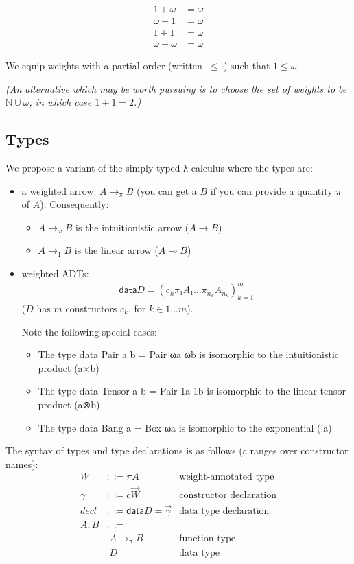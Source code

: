 \documentclass[11pt]{article}
\begin{document}
\begin{align*}
1 + ω &= ω \\
ω + 1 &= ω \\
1 + 1 &= ω \\
ω + ω &= ω
\end{align*}

We equip weights with a partial order (written \(· ≤ ·\)) such that \(1 ≤ ω\).

\emph{(An alternative which may be worth pursuing is to choose the set of
weights to be \(ℕ∪{ω}\), in which case \(1+1=2\).)}

\subsection{Types}
\label{sec:orgheadline2}

We propose a variant of the simply typed λ-calculus where the types
are:

\begin{itemize}
\item a weighted arrow: \(A →_π B\) (you can get a \(B\) if you can provide a
quantity \(π\) of \(A\)). Consequently:
\begin{itemize}
\item \(A →_ω B\) is the intuitionistic arrow (\(A → B\))
\item \(A →_1 B\) is the linear arrow (\(A ⊸ B\))
\end{itemize}
\item weighted ADTs:
\begin{align*}
\mathsf{data} D = \left(c_k  π₁ A₁  …  π_{n_k} A_{n_k}\right)^m_{k=1}
\end{align*}
(\(D\) has \(m\) constructors \(c_k\), for \(k ∈ 1…m\)).

Note the following special cases:
\begin{itemize}
\item The type data Pair a b = Pair ωa ωb is isomorphic to the intuitionistic product (a×b)
\item The type data Tensor a b = Pair 1a 1b is isomorphic to the linear tensor product (a⊗b)
\item The type data Bang a = Box ωa is isomorphic to the exponential (!a)
\end{itemize}
\end{itemize}

The syntax of types and type declarations is as follows ($c$ ranges over constructor names):
\begin{align*}
  W &::= πA &\text{weight-annotated type}\\
  γ &::= c  \vec{W}&\text{constructor declaration}\\
  decl &::= \mathsf{data } D = \vec{γ}&\text{data type declaration}\\
  A,B &::=\\
      & |  A →_π B &\text{function type}\\
      & |  D &\text{data type}
\end{align*}
\end{document}
